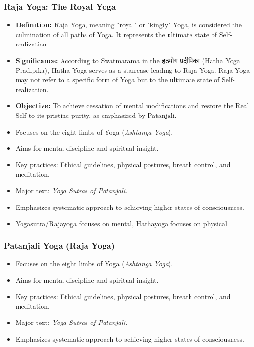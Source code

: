 \begin{frame}[fragile]\frametitle{Raja Yoga: The Royal Yoga}
    
      \begin{itemize}
	  \item \textbf{Definition:} Raja Yoga, meaning "royal" or "kingly" Yoga, is considered the culmination of all paths of Yoga. It represents the ultimate state of Self-realization.
	  \item  \textbf{Significance:} According to Swatmarama in the हठयोग प्रदीपिका (Hatha Yoga Pradipika), Hatha Yoga serves as a staircase leading to Raja Yoga. Raja Yoga may not refer to a specific form of Yoga but to the ultimate state of Self-realization.
	  \item \textbf{Objective:} To achieve cessation of mental modifications and restore the Real Self to its pristine purity, as emphasized by Patanjali.
		\item Focuses on the eight limbs of Yoga (\textit{Ashtanga Yoga}).
		\item Aims for mental discipline and spiritual insight.
		\item Key practices: Ethical guidelines, physical postures, breath control, and meditation.
		\item Major text: \textit{Yoga Sutras of Patanjali}.
		\item Emphasizes systematic approach to achieving higher states of consciousness.
		\item Yogasutra/Rajayoga focuses on mental, Hathayoga focuses on physical
	  \end{itemize}
    
\end{frame}



\begin{frame}[fragile]\frametitle{Patanjali Yoga (Raja Yoga)}

      \begin{itemize}
		\item Focuses on the eight limbs of Yoga (\textit{Ashtanga Yoga}).
		\item Aims for mental discipline and spiritual insight.
		\item Key practices: Ethical guidelines, physical postures, breath control, and meditation.
		\item Major text: \textit{Yoga Sutras of Patanjali}.
		\item Emphasizes systematic approach to achieving higher states of consciousness.
	  \end{itemize}

\end{frame}

